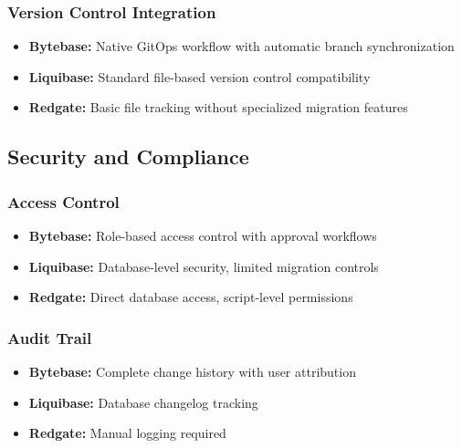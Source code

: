 \subsubsection{Version Control Integration}
\begin{itemize}
    \item \textbf{Bytebase:} Native GitOps workflow with automatic branch synchronization
    \item \textbf{Liquibase:} Standard file-based version control compatibility
    \item \textbf{Redgate:} Basic file tracking without specialized migration features
\end{itemize}

\subsection{Security and Compliance}

\subsubsection{Access Control}
\begin{itemize}
    \item \textbf{Bytebase:} Role-based access control with approval workflows
    \item \textbf{Liquibase:} Database-level security, limited migration controls
    \item \textbf{Redgate:} Direct database access, script-level permissions
\end{itemize}

\subsubsection{Audit Trail}
\begin{itemize}
    \item \textbf{Bytebase:} Complete change history with user attribution
    \item \textbf{Liquibase:} Database changelog tracking
    \item \textbf{Redgate:} Manual logging required
\end{itemize}
